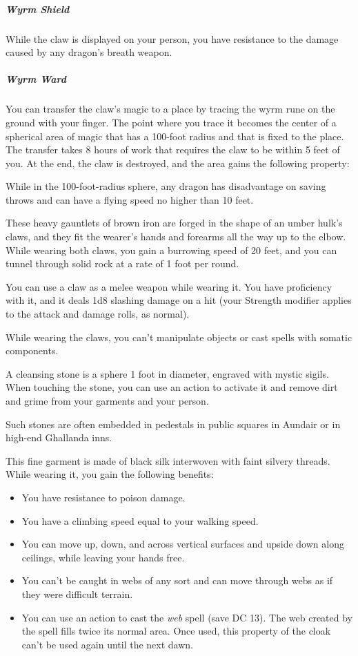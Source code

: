 \documentclass[10pt,a4paper,twoside,bg=print,twocolumn,openany,nodeprecatedcode]{dndbook}
\begin{document}
\subparagraph{Wyrm Shield}
While the claw is displayed on your person, you have resistance to the damage caused by any dragon's breath weapon.

\subparagraph{Wyrm Ward}
You can transfer the claw's magic to a place by tracing the wyrm rune on the ground with your finger. The point where you trace it becomes the center of a spherical area of magic that has a 100-foot radius and that is fixed to the place. The transfer takes 8 hours of work that requires the claw to be within 5 feet of you. At the end, the claw is destroyed, and the area gains the following property:

While in the 100-foot-radius sphere, any dragon has disadvantage on saving throws and can have a flying speed no higher than 10 feet.

These heavy gauntlets of brown iron are forged in the shape of an umber hulk's claws, and they fit the wearer's hands and forearms all the way up to the elbow. While wearing both claws, you gain a burrowing speed of 20 feet, and you can tunnel through solid rock at a rate of 1 foot per round.

You can use a claw as a melee weapon while wearing it. You have proficiency with it, and it deals 1d8 slashing damage on a hit (your Strength modifier applies to the attack and damage rolls, as normal).

While wearing the claws, you can't manipulate objects or cast spells with somatic components.

A cleansing stone is a sphere 1 foot in diameter, engraved with mystic sigils. When touching the stone, you can use an action to activate it and remove dirt and grime from your garments and your person.

Such stones are often embedded in pedestals in public squares in Aundair or in high-end Ghallanda inns.

This fine garment is made of black silk interwoven with faint silvery threads. While wearing it, you gain the following benefits:


\begin{itemize}
\item You have resistance to poison damage.
\item You have a climbing speed equal to your walking speed.
\item You can move up, down, and across vertical surfaces and upside down along ceilings, while leaving your hands free.
\item You can't be caught in webs of any sort and can move through webs as if they were difficult terrain.
\item You can use an action to cast the \textit{web} spell (save DC 13). The web created by the spell fills twice its normal area. Once used, this property of the cloak can't be used again until the next dawn.
\end{itemize}
\end{document}
